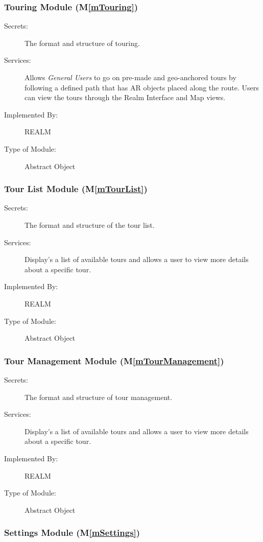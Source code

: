 \documentclass[12pt, titlepage]{article}
\newcommand{\mref}[1]{M\ref{#1}}
\begin{document}
\subsubsection{Touring Module (\mref{mTouring})}

\begin{description}
\item[Secrets:]The format and structure of touring.
\item[Services:]Allows \textit{General Users} to go on pre-made and geo-anchored tours by following a defined path that has AR objects placed along the route. Users can view the tours through the Realm Interface and Map views.
\item[Implemented By:]REALM
\item[Type of Module:]Abstract Object
\end{description}

\subsubsection{Tour List Module (\mref{mTourList})}

\begin{description}
\item[Secrets:]The format and structure of the tour list.
\item[Services:]Display's a list of available tours and allows a user to view more details about a specific tour.
\item[Implemented By:]REALM
\item[Type of Module:]Abstract Object
\end{description}

\subsubsection{Tour Management Module (\mref{mTourManagement})}

\begin{description}
\item[Secrets:]The format and structure of tour management.
\item[Services:]Display's a list of available tours and allows a user to view more details about a specific tour.
\item[Implemented By:]REALM
\item[Type of Module:]Abstract Object
\end{description}

\subsubsection{Settings Module (\mref{mSettings})}
\end{document}
